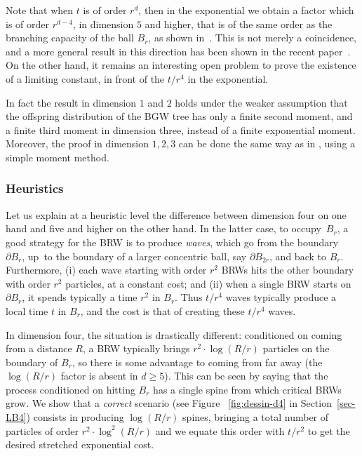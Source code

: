 Note that when $t$ is of order $r^d$, then in the exponential we obtain a factor which is of order $r^{d-4}$, in dimension $5$ and higher, that is of the same order as the branching capacity of the ball $B_r$, as shown in~\cite{Zhu1}.
This is not merely a coincidence, and a more general result in this direction has been shown in the recent paper~\cite{ASS23}.
On the other hand, it remains an interesting open problem to prove the existence of a limiting constant, in front of the $t/r^4$ in the exponential.

\begin{remark}
In fact the result in dimension $1$ and $2$ holds under the weaker assumption that the offspring distribution of the BGW tree has only a finite second moment, and a finite third moment in dimension three, instead of a finite exponential moment. Moreover, the proof in dimension $1,2,3$ can be done the same way as in \cite{AHJ}, using a simple moment method.
\end{remark}

\subsubsection*{Heuristics}
Let us explain at a heuristic level the difference between
dimension four on one hand and five and higher on the other hand.
In the latter case, to occupy~$B_r$, a good strategy for the BRW is to produce
\emph{waves}, which go from the boundary~$\partial B_r$,
up~to the boundary of a larger concentric ball,
say $\partial B_{2r}$, and back to $B_r$.
Furthermore, (i) each wave starting with order $r^2$ BRWs
hits the other boundary with order $r^2$ particles, at a constant cost; and
(ii) when a single BRW starts on $\partial B_r$,
it spends typically a time $r^2$ in $B_r$.
Thus $t/r^4$ waves typically produce a local time $t$ in $B_r$, and
the cost is that of creating these $t/r^4$ waves.

In dimension four, the situation is drastically different: conditioned
on coming from a distance $R$, a BRW typically brings $r^2\cdot \log(R/r)$ particles on
the boundary of $B_r$, so there is some advantage to coming from
far away (the $\log(R/r)$ factor is absent in $d\ge 5$). This can be seen
by saying that the process conditioned on hitting $B_r$ has a single
spine from which critical BRWs grow. We show that a {\it correct} scenario
(see Figure ~\ref{fig:dessin-d4} in Section~\ref{sec-LB4})
consists in producing $\log(R/r)$ spines, bringing a total number
of particles of order $r^2\cdot \log^2(R/r)$ and we equate this order
with $t/r^2$ to get the desired stretched exponential cost.

